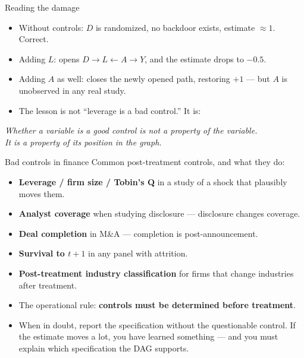 \documentclass[
  11pt,
  ignorenonframetext,
  aspectratio=169,
]{beamer}
\providecommand{\tightlist}{%
  \setlength{\itemsep}{0pt}\setlength{\parskip}{0pt}}
\begin{document}
\begin{frame}{Reading the damage}
\protect{}\label{reading-the-damage}
\begin{itemize}
\tightlist
\item
  Without controls: \(D\) is randomized, no backdoor exists, estimate
  \(\approx 1\). Correct.
\item
  Adding \(L\): opens \(D \to L \leftarrow A \to Y\), and the estimate
  drops to \(-0.5\).
\item
  Adding \(A\) as well: closes the newly opened path, restoring \(+1\)
  --- but \(A\) is unobserved in any real study.
\item
  The lesson is not ``leverage is a bad control.'' It is:
\end{itemize}

\begin{center}
\emph{Whether a variable is a good control is not a property of the variable.\\
It is a property of its position in the graph.}
\end{center}
\end{frame}

\begin{frame}{Bad controls in finance}
\protect{}\label{bad-controls-in-finance}
Common post-treatment controls, and what they do:

\begin{itemize}
\tightlist
\item
  \textbf{Leverage / firm size / Tobin's Q} in a study of a shock that
  plausibly moves them.
\item
  \textbf{Analyst coverage} when studying disclosure --- disclosure
  changes coverage.
\item
  \textbf{Deal completion} in M\&A --- completion is post-announcement.
\item
  \textbf{Survival to \(t+1\)} in any panel with attrition.
\item
  \textbf{Post-treatment industry classification} for firms that change
  industries after treatment.
\end{itemize}

\vspace{0.4em}

\begin{itemize}
\tightlist
\item
  The operational rule: \textbf{controls must be determined before
  treatment}.
\item
  When in doubt, report the specification without the questionable
  control. If the estimate moves a lot, you have learned something ---
  and you must explain which specification the DAG supports.
\end{itemize}
\end{frame}
\end{document}
